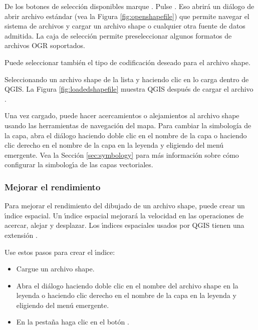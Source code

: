 De los botones de selecci\'on disponibles marque . Pulse . Eso abrir\'a un di\'alogo de abrir archivo estándar (vea la Figura \ref{fig:openshapefile}) que permite navegar el sistema de archivos y cargar un archivo shape o cualquier otra fuente de datos admitida. 
La caja de selecci\'on  permite preseleccionar algunos formatos de archivos OGR soportados.

Puede seleccionar también el tipo de codificaci\'on deseado para el archivo shape.

Seleccionando un archivo shape de la lista y haciendo clic en  lo carga dentro de QGIS. La Figura
\ref{fig:loadedshapefile} muestra QGIS después de cargar el archivo .


\begin{Tip}\caption{\textsc{Colores de la capa}}
\end{Tip}

Una vez cargado, puede hacer acercamientos o alejamientos al archivo shape usando las herramientas de navegaci\'on del mapa.
Para cambiar la simbolog\'ia de la capa, abra el di\'alogo  haciendo doble clic en el nombre de la capa o haciendo clic derecho en el nombre de la capa en la leyenda y eligiendo  del men\'u emergente. Vea la  Secci\'on \ref{sec:symbology} para más informaci\'on sobre cómo configurar la simbolog\'{\i}a de las capas vectoriales.
  
\subsubsection{Mejorar el rendimiento}

Para mejorar el rendimiento del dibujado de un archivo shape, puede crear un \'{\i}ndice espacial. Un \'{\i}ndice espacial  mejorar\'a la velocidad en las operaciones de acercar, alejar y desplazar. Los \'{\i}ndices espaciales usados por QGIS tienen una extensi\'on .

Use estos pasos para crear el \'{\i}ndice:

\begin{itemize}
\item Cargue un archivo shape.
\item Abra el di\'alogo  haciendo doble clic en el nombre del archivo shape en la leyenda o haciendo clic derecho en el nombre de la capa en la leyenda y eligiendo  del men\'u emergente.
\item En la pesta\~na  haga clic en el bot\'on .
\end{itemize}

